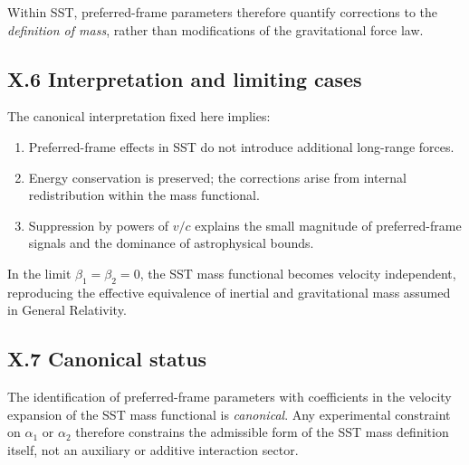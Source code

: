 \documentclass[10pt]{article}
\begin{document}
        Within SST, preferred-frame parameters therefore quantify corrections to the
        \emph{definition of mass}, rather than modifications of the gravitational
        force law.

    \subsection*{X.6 Interpretation and limiting cases}

        The canonical interpretation fixed here implies:
        \begin{enumerate}
            \item Preferred-frame effects in SST do not introduce additional long-range
            forces.
            \item Energy conservation is preserved; the corrections arise from internal
            redistribution within the mass functional.
            \item Suppression by powers of $v/c$ explains the small magnitude of
            preferred-frame signals and the dominance of astrophysical bounds.
        \end{enumerate}

        In the limit $\beta_1 = \beta_2 = 0$, the SST mass functional becomes
        velocity independent, reproducing the effective equivalence of inertial and
        gravitational mass assumed in General Relativity.

    \subsection*{X.7 Canonical status}

        The identification of preferred-frame parameters with coefficients in the
        velocity expansion of the SST mass functional is \emph{canonical}.
        Any experimental constraint on $\alpha_1$ or $\alpha_2$ therefore constrains
        the admissible form of the SST mass definition itself, not an auxiliary or
        additive interaction sector.


        
\end{document}
